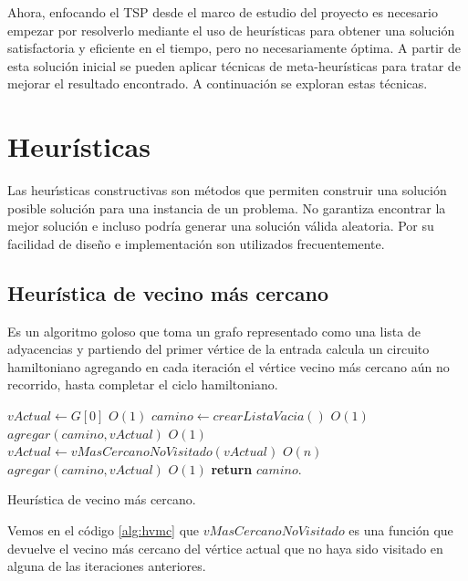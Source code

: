 \documentclass[10pt,a4paper]{article}
\begin{document}
Ahora, enfocando el TSP desde el marco de estudio del proyecto es necesario empezar por resolverlo mediante el uso de heurísticas \cite{teo:Heuristicas} para obtener una solución satisfactoria y eficiente en el tiempo, pero no necesariamente óptima. A partir de esta solución inicial se pueden aplicar técnicas de meta-heurísticas para tratar de mejorar el resultado encontrado. A continuación se exploran estas técnicas.

\newpage
\section{Heurísticas}

Las heurı́sticas constructivas son métodos que permiten construir una solución posible solución para una instancia de un problema. No garantiza encontrar la mejor solución e incluso podría generar una solución válida aleatoria. Por su facilidad de diseño e implementación son utilizados frecuentemente.

\subsection{Heurística de vecino más cercano}
Es un algoritmo goloso que toma un grafo representado como una lista de adyacencias y partiendo del primer vértice de la entrada calcula un circuito hamiltoniano agregando en cada iteración el vértice vecino más cercano aún no recorrido, hasta completar el ciclo hamiltoniano.

\begin{algorithm}
	\begin{algorithmic}[1]
		\State $vActual \leftarrow G[0]$ \Comment $O(1)$
		\State $camino \leftarrow crearListaVacia()$  \Comment $O(1)$
		\State  $agregar(camino, vActual)$  \Comment $O(1)$
		        \State $vActual \leftarrow vMasCercanoNoVisitado(vActual)$ \Comment $O(n)$
		        \State $agregar(camino, vActual)$ \Comment $O(1)$
		\EndWhile
		\State \textbf{return} $camino$.

		\EndFunction
	\end{algorithmic}
	\caption{Heurística de vecino más cercano.}
	\label{alg:hvmc}
\end{algorithm}

Vemos en el código \ref{alg:hvmc} que $vMasCercanoNoVisitado$ es una función que devuelve el vecino más cercano del vértice actual que no haya sido visitado en alguna de las iteraciones anteriores.
\end{document}
